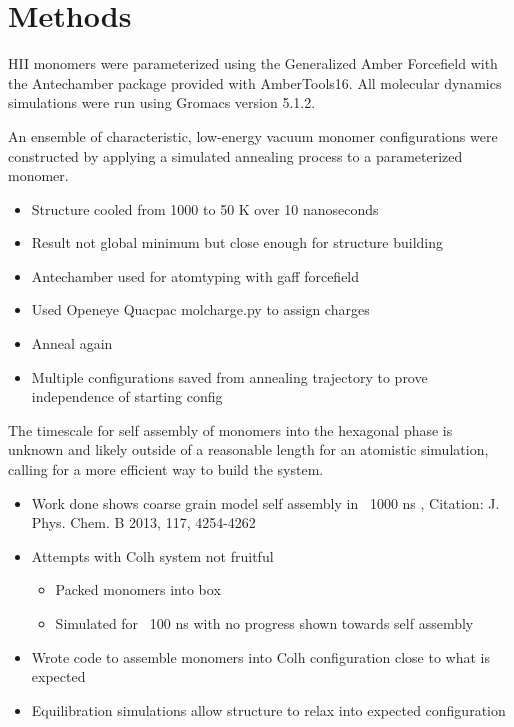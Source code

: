 \documentclass{article}
\begin{document}
	\section{Methods}
	
	HII monomers were parameterized using the Generalized Amber Forcefield with the Antechamber package provided with AmberTools16. All molecular dynamics simulations were run using Gromacs version 5.1.2.
	
	An ensemble of characteristic, low-energy vacuum monomer configurations were constructed by applying a simulated annealing process to a parameterized monomer.
	\begin{itemize}
		\item Structure cooled from 1000 to 50 K over 10 nanoseconds
		\item Result not global minimum but close enough for structure building
		\item Antechamber used for atomtyping with gaff forcefield
		\item Used Openeye Quacpac molcharge.py to assign charges
		\item Anneal again 
		\item Multiple configurations saved from annealing trajectory to prove independence of starting config
	\end{itemize}
	
	The timescale for self assembly of monomers into the hexagonal phase is unknown and likely outside of a reasonable length for an atomistic simulation, calling for a more efficient way to build the system. 
	\begin{itemize}
		\item Work done shows coarse grain model self assembly in ~1000 ns , Citation: J. Phys. Chem. B 2013, 117, 4254-4262
		\item Attempts with Colh system not fruitful  
		\begin{itemize}
			\item Packed monomers into box
			\item Simulated for ~100 ns with no progress shown towards self assembly
		\end{itemize}  
		\item Wrote code to assemble monomers into Colh configuration close to what is expected 
		\item Equilibration simulations allow structure to relax into expected configuration 
	\end{itemize}
	
\end{document}
